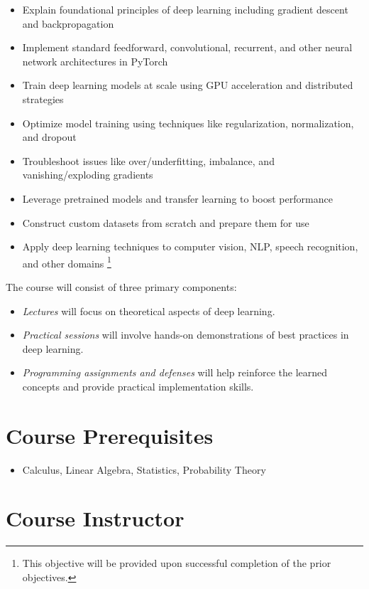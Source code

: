 \documentclass[
]{book}
\providecommand{\tightlist}{%
  \setlength{\itemsep}{0pt}\setlength{\parskip}{0pt}}
\begin{document}
\begin{itemize}
\item
  Explain foundational principles of deep learning including gradient descent and backpropagation
\item
  Implement standard feedforward, convolutional, recurrent, and other neural network architectures in PyTorch
\item
  Train deep learning models at scale using GPU acceleration and distributed strategies
\item
  Optimize model training using techniques like regularization, normalization, and dropout
\item
  Troubleshoot issues like over/underfitting, imbalance, and vanishing/exploding gradients
\item
  Leverage pretrained models and transfer learning to boost performance
\item
  Construct custom datasets from scratch and prepare them for use
\item
  Apply deep learning techniques to computer vision, NLP, speech recognition, and other domains \footnote{This objective will be provided upon successful completion of the prior objectives.}
\end{itemize}

The course will consist of three primary components:

\begin{itemize}
\tightlist
\item
  \emph{Lectures} will focus on theoretical aspects of deep learning.
\item
  \emph{Practical sessions} will involve hands-on demonstrations of best practices in deep learning.
\item
  \emph{Programming assignments and defenses} will help reinforce the learned concepts and provide practical implementation skills.
\end{itemize}

\hypertarget{course-prerequisites}{%
\section{Course Prerequisites}\label{course-prerequisites}}

\begin{itemize}
\tightlist
\item
  Calculus, Linear Algebra, Statistics, Probability Theory
\end{itemize}

\hypertarget{course-instructor}{%
\section{Course Instructor}\label{course-instructor}}
\end{document}
